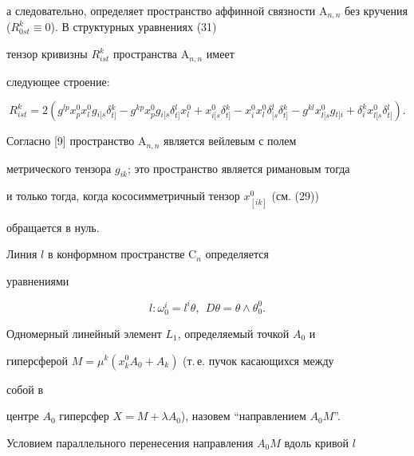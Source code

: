 а следовательно, определяет пространство аффинной связности $\mathrm 


A_{n,n}$ без кручения ($R^k_{0st}\equiv0$). В структурных уравнениях (31) 


тензор кривизны $R^k_{ist}$ пространства $\mathrm A_{n,n}$ имеет 


следующее строение: 


\begin{equation} 


R^k_{ist}=2(g^{lp}x^0_p x^0_l g{}_{i[s}\delta{}^k_{t]}- 


g^{kp}x^0_p g{}_{i[s}\delta{}^l_{t]}x^0_l+ 


x{}^0_{i[s}\delta{}^k_{t]}-x^0_i x^0_l 


\delta{}^l_{[s}\delta{}^k_{t]}-g^{kl} 


x{}^0_{l[s}g{}_{t]i}+\delta^k_i x{}^0_{l[s} 


\delta{}^l_{t]}). 


\end{equation} 


 


Согласно [9] пространство $\mathrm A_{n,n}$ является вейлевым с полем 


метрического тензора $g_{ik}$; это пространство является римановым тогда 


и только тогда, когда кососимметричный тензор $x^0_{[ik]}$ (см. (29)) 


обращается в нуль. 


 


Линия $l$ в конформном пространстве $\mathrm C_n$ определяется 


уравнениями 


$$ 


l:\omega^i_0=l^i\theta,\ \ D\theta=\theta\wedge\theta^0_0. 


$$ 


 


Одномерный линейный элемент $L_1$, определяемый точкой $A_0$ и 


гиперсферой $M=\mu^k(x^0_k A_0+A_k)$ (т.\,е. пучок касающихся между 


собой в 


центре $A_0$ гиперсфер $X=M+\lambda A_0$), назовем ``направлением $A_0M$''. 


 


Условием параллельного перенесения направления $A_0M$ вдоль кривой $l$ 


